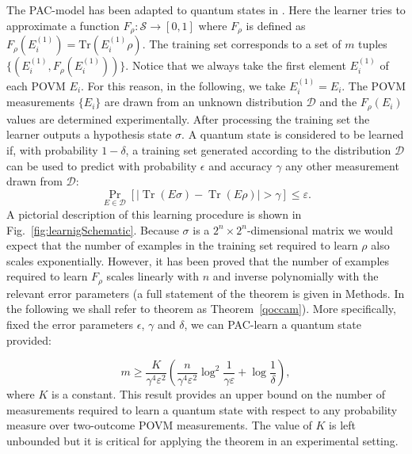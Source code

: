 \documentclass[aps,superscriptaddress,nofootinbib,twocolumn]{revtex4-1}
\begin{document}
The PAC-model has been adapted to quantum states in \cite{aaronson2007learnability}. Here the learner tries to approximate a function $F_{\rho}: \mathcal{S} \rightarrow [0,1]$ where $F_{\rho}$ is defined as $F_{\rho} (E_i ^{(1)}) = \mathrm{Tr} (E_i ^{(1)} \rho)$. The training set corresponds to a set of $m$ tuples $\{( E_i ^{(1)},F_{\rho} (E_i ^{(1)}))  \}$. Notice that we always take the first element $E_i ^{(1)} $ of each POVM $E_i$. For this reason, in the following, we take $E_i ^{(1)} = E_i$. The POVM measurements $\{E_i\}$ are drawn from an unknown distribution $\mathcal{D}$ and the $F_{\rho} (E_i)$ values are determined experimentally. After processing the training set the learner outputs a hypothesis state $\sigma$. A quantum state is considered to be learned if, with probability $1-\delta$, a training set generated according to the distribution $\mathcal{D}$ can be used to predict with probability $\epsilon$ and accuracy $\gamma$ any other measurement drawn from $\mathcal{D}$:
\begin{equation}\label{eq:learncond}
\Pr_{E\in\mathcal{D}}\left[  \left\vert \operatorname*{Tr}\left(
E\sigma\right)  -\operatorname*{Tr}\left(  E\rho\right)  \right\vert
>\gamma\right]  \leq\varepsilon.
\end{equation} 
A pictorial description of this learning procedure is shown in Fig.~\ref{fig:learnigSchematic}.
Because $\sigma$ is a $2^n \times 2^n$-dimensional matrix we would expect that the number of examples in the training set required to learn $\rho$ also scales exponentially. However, it has been proved \cite{aaronson2007learnability} that the number of examples required to learn $F_{\rho}$ scales linearly with $n$ and inverse polynomially with the relevant error parameters (a full statement of the theorem is given in Methods. In the following we shall refer to theorem as Theorem~\ref{qoccam}). More specifically, fixed the error parameters $\epsilon$, $\gamma$ and $\delta$, we can PAC-learn a quantum state provided:

\begin{equation}\label{eq:mscaling}
m\geq\frac{K}{\gamma^{4}\varepsilon^{2}}\left(  \frac{n}{\gamma^{4}%
\varepsilon^{2}}\log^{2}\frac{1}{\gamma\varepsilon}+\log\frac{1}{\delta
}\right), 
\end{equation}
where $K$ is a constant. This result provides an upper bound on the number of measurements required to learn a quantum state with respect to any probability measure over two-outcome POVM measurements. The value of $K$ is left unbounded but it is critical for applying the theorem in an experimental setting. 
\end{document}
